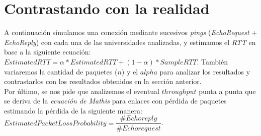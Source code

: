 \documentclass[final,inline,a4paper,narroweqnarray]{ieee}
\let\Oldsection\section
\renewcommand{\section}{\FloatBarrier\Oldsection}
\begin{document}
\section{Contrastando con la realidad}
A continuación simulamos una conexión mediante sucesivos \emph{pings} (\emph{EchoRequest} $+$ \emph{EchoReply}) 
con cada una de las universidades analizadas, y estimamos el \emph{RTT} en base a la siguiente ecuación: 
$ EstimatedRTT = \alpha * EstimatedRTT + (1 - \alpha) * SampleRTT $. 
También variaremos la cantidad de paquetes ($n$) y el $alpha$ para analizar los resultados y contrastarlos con
los resultados obtenidos en la sección anterior. \\
Por último, se nos pide que analizemos el eventual $throughput$ punta a punta que se deriva de la
\emph{ecuación de Mathis} para enlaces con pérdida de paquetes estimando la pérdida de la siguiente manera:
$EstimatedPacketLossProbability = \dfrac{\#Echo reply}{\#Echo request}$.
\end{document}
